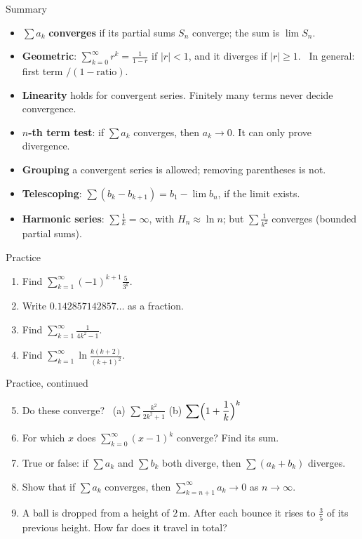 \documentclass{wosm-slides}
\begin{document}
\begin{frame}{Summary}
  \begin{itemize}
    \item $\sum a_k$ \textbf{converges} if its partial sums $S_n$ converge;
      the sum is $\lim S_n$.
    \item \textbf{Geometric}: $\sum_{k=0}^\infty r^k = \frac{1}{1-r}$ if $|r| < 1$, and
      it diverges if $|r| \ge 1$. \ In general: first term $/ (1 - \text{ratio})$.
    \item \textbf{Linearity} holds for convergent series.
      Finitely many terms never decide convergence.
    \item \textbf{$n$-th term test}: if $\sum a_k$ converges, then $a_k \to 0$.
      It can only prove divergence.
    \item \textbf{Grouping} a convergent series is allowed; removing parentheses is not.
    \item \textbf{Telescoping}: $\sum (b_k - b_{k+1}) = b_1 - \lim b_n$, if the limit exists.
    \item \textbf{Harmonic series}: $\sum \frac1k = \infty$, with $H_n \approx \ln n$;
      but $\sum \frac1{k^2}$ converges (bounded partial sums).
  \end{itemize}
\end{frame}

\begin{frame}{Practice}
  \small
  \begin{enumerate}
    \item Find $\displaystyle\sum_{k=1}^\infty (-1)^{k+1} \frac{5}{3^k}$.
    \item Write $0.142857142857\ldots$ as a fraction.
    \item Find $\displaystyle\sum_{k=1}^\infty \frac{1}{4k^2 - 1}$.
    \item Find $\displaystyle\sum_{k=1}^\infty \ln \frac{k(k+2)}{(k+1)^2}$.
  \end{enumerate}
\end{frame}

\begin{frame}{Practice, continued}
  \small
  \begin{enumerate}
    \setcounter{enumi}{4}
    \item Do these converge? \ (a) $\displaystyle\sum \frac{k^2}{2k^2 + 1}$ \quad
      (b) $\displaystyle\sum \Bigl(1 + \frac1k\Bigr)^k$
    \item For which $x$ does $\sum_{k=0}^\infty (x-1)^k$ converge? Find its sum.
    \item True or false: if $\sum a_k$ and $\sum b_k$ both diverge, then
      $\sum (a_k + b_k)$ diverges.
    \item Show that if $\sum a_k$ converges, then $\sum_{k=n+1}^\infty a_k \to 0$ as $n \to \infty$.
    \item A ball is dropped from a height of $2$\,m. After each bounce it rises to
      $\frac35$ of its previous height. How far does it travel in total?
  \end{enumerate}
\end{frame}
\end{document}
